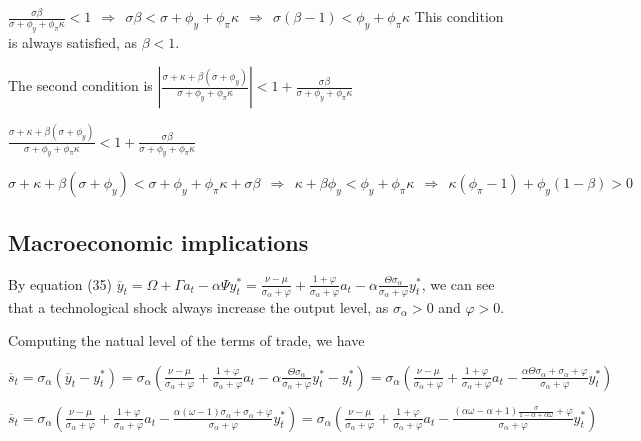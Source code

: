\documentclass[
]{article}
\begin{document}
\(\displaystyle \frac{\sigma \beta}{\sigma+ \phi_y+\phi_\pi \kappa} <1 \ \ \Rightarrow \ \ \sigma \beta<\sigma+ \phi_y+\phi_\pi \kappa \ \ \Rightarrow \ \ \sigma (\beta-1)< \phi_y+\phi_\pi \kappa\)
This condition is always satisfied, as \(\beta<1\).

The second condition is
\(\displaystyle \left| \frac{\sigma+\kappa+ \beta(\sigma+\phi_y)}{\sigma+ \phi_y+\phi_\pi \kappa} \right|<1+\frac{\sigma \beta}{\sigma+ \phi_y+\phi_\pi \kappa}\)

\(\displaystyle \frac{\sigma+\kappa+ \beta(\sigma+\phi_y)}{\sigma+ \phi_y+\phi_\pi \kappa} < 1+\frac{\sigma \beta}{\sigma+ \phi_y+\phi_\pi \kappa}\)

\(\sigma+\kappa+ \beta(\sigma+\phi_y) < \sigma+ \phi_y+\phi_\pi \kappa + \sigma \beta \ \ \Rightarrow \ \ \kappa + \beta \phi_y<\phi_y+\phi_\pi \kappa \ \ \Rightarrow \ \ \kappa (\phi_\pi-1)+\phi_y(1-\beta)>0\)

\hypertarget{macroeconomic-implications}{%
\subsection{Macroeconomic
implications}\label{macroeconomic-implications}}

By equation (35)
\(\displaystyle \overline{y}_t=\Omega+\Gamma a_t -\alpha \Psi y_t^*=\frac{\nu-\mu}{\sigma_\alpha+\varphi}+\frac{1+\varphi}{\sigma_\alpha+\varphi} a_t -\alpha \frac{\Theta \sigma_\alpha}{\sigma_\alpha+\varphi}y_t^*\),
we can see that a technological shock always increase the output level,
as \(\sigma_\alpha>0\) and \(\varphi>0\).

Computing the natual level of the terms of trade, we have

\(\displaystyle \overline{s}_t=\sigma_\alpha (\overline{y}_t-y_t^*)=\sigma_\alpha \left(\frac{\nu-\mu}{\sigma_\alpha+\varphi}+\frac{1+\varphi}{\sigma_\alpha+\varphi} a_t -\alpha \frac{\Theta \sigma_\alpha}{\sigma_\alpha+\varphi}y_t^* -y_t^* \right)=\sigma_\alpha \left(\frac{\nu-\mu}{\sigma_\alpha+\varphi}+\frac{1+\varphi}{\sigma_\alpha+\varphi} a_t - \frac{\alpha \Theta \sigma_\alpha+\sigma_\alpha+\varphi}{\sigma_\alpha+\varphi}y_t^* \right)\)

\(\displaystyle \overline{s}_t=\sigma_\alpha \left(\frac{\nu-\mu}{\sigma_\alpha+\varphi}+\frac{1+\varphi}{\sigma_\alpha+\varphi} a_t - \frac{\alpha (\omega-1) \sigma_\alpha+\sigma_\alpha+\varphi}{\sigma_\alpha+\varphi}y_t^* \right)=\sigma_\alpha \left(\frac{\nu-\mu}{\sigma_\alpha+\varphi}+\frac{1+\varphi}{\sigma_\alpha+\varphi} a_t - \frac{(\alpha \omega- \alpha+1)\displaystyle \frac{\sigma}{1-\alpha+\alpha \omega} +\varphi}{\sigma_\alpha+\varphi}y_t^* \right)\)
\end{document}

